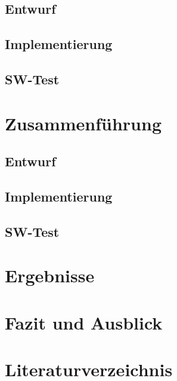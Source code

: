 \documentclass[a4paper, portrait, 12pt]{scrartcl} %
\begin{document}
\subsection{Entwurf}

\pagebreak
\subsection{Implementierung}

\pagebreak

\subsection{SW-Test}

\pagebreak

\section{Zusammenführung}
\subsection{Entwurf}
\subsection{Implementierung}
\subsection{SW-Test}

\pagebreak


\pagebreak

\section{Ergebnisse}

\pagebreak

\section{Fazit und Ausblick}

\pagebreak

\section{Literaturverzeichnis}
\printbibliography
\pagebreak
\end{document}
